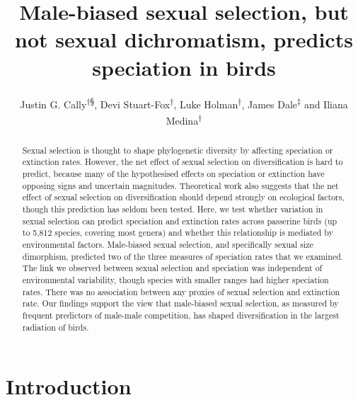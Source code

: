\documentclass[]{article}
\title{Male-biased sexual selection, but not sexual dichromatism, predicts
speciation in birds}
\author{Justin G. Cally\textsuperscript{†§}, Devi Stuart-Fox\textsuperscript{†},
Luke Holman\textsuperscript{†}, James Dale\textsuperscript{‡} and Iliana
Medina\textsuperscript{†}}
\date{}
\begin{document}
\maketitle
\begin{abstract}
Sexual selection is thought to shape phylogenetic diversity by affecting
speciation or extinction rates. However, the net effect of sexual
selection on diversification is hard to predict, because many of the
hypothesised effects on speciation or extinction have opposing signs and
uncertain magnitudes. Theoretical work also suggests that the net effect
of sexual selection on diversification should depend strongly on
ecological factors, though this prediction has seldom been tested. Here,
we test whether variation in sexual selection can predict speciation and
extinction rates across passerine birds (up to 5,812 species, covering
most genera) and whether this relationship is mediated by environmental
factors. Male-biased sexual selection, and specifically sexual size
dimorphism, predicted two of the three measures of speciation rates that
we examined. The link we observed between sexual selection and
speciation was independent of environmental variability, though species
with smaller ranges had higher speciation rates. There was no
association between any proxies of sexual selection and extinction rate.
Our findings support the view that male-biased sexual selection, as
measured by frequent predictors of male-male competition, has shaped
diversification in the largest radiation of birds.
\end{abstract}

\maketitle{}

\newpage
{}

\hypertarget{introduction}{%
\section{Introduction}\label{introduction}}
\end{document}
